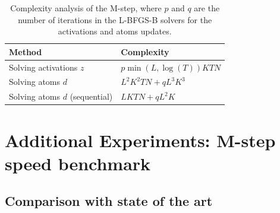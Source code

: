 \begin{appendices}
\begin{table}[htb]
\begin{center}
\begin{tabular}{|l|l|}
\hline
Method & Complexity \\
\hline
Solving activations $z$ & $p\min(L, \log(T))KTN$ \\
Solving atoms $d$ & $L^2K^2TN + qL^3K^3$ \\
Solving atoms $d$ (sequential) & $LKTN + qL^2K$ \\
\hline
\end{tabular}
\vspace{5pt}
\caption{Complexity analysis of the M-step, where $p$ and $q$ are the number of iterations in the L-BFGS-B solvers for the activations and atoms updates.}
\label{table:complexity_m}
\end{center}
\end{table}

\section{Additional Experiments: M-step speed benchmark}

\subsection{Comparison with state of the art}


\end{appendices}
